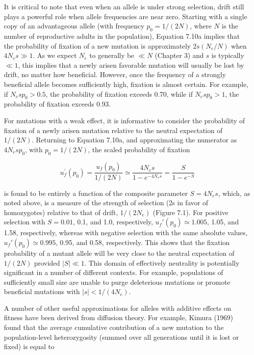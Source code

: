 \documentclass{article}
\begin{document}
It is critical to note that even when an allele is under strong selection, drift still plays a powerful role when allele frequencies are near zero. Starting with a single copy of an advantageous allele (with frequency  $ p_0 = 1/(2N) $, where  $ N $ is the number of reproductive adults in the population), Equation 7.10a implies that the probability of fixation of a new mutation is approximately  $ 2s(N_e/N) $ when  $ 4N_e s \gg 1 $. As we expect  $ N_e $ to generally be  $ \ll N $ (Chapter 3) and  $ s $ is typically  $ \ll 1 $, this implies that a newly arisen favorable mutation will usually be lost by drift, no matter how beneficial. However, once the frequency of a strongly beneficial allele becomes sufficiently high, fixation is almost certain. For example, if  $ N_{e}sp_0 > 0.5 $, the probability of fixation exceeds 0.70, while if  $ N_{e}sp_0 > 1 $, the probability of fixation exceeds 0.93.

For mutations with a weak effect, it is informative to consider the probability of fixation of a newly arisen mutation relative to the neutral expectation of  $ 1/(2N) $. Returning to Equation 7.10a, and approximating the numerator as  $ 4N_{e}sp_{0} $, with  $ p_{0}=1/(2N) $, the scaled probability of fixation

\begin{equation}
u_{f}^{\prime}(p_{0})=\frac{u_{f}(p_{0})}{1/(2N)}\simeq\frac{4N_{e}s}{1-e^{-4N_{e}s}}=\frac{S}{1-e^{-S}}
\tag{7.11}
\label{eq:7_11}
\end{equation}

is found to be entirely a function of the composite parameter  $ S = 4N_e s $, which, as noted above, is a measure of the strength of selection (2s in favor of homozygotes) relative to that of drift,  $ 1/(2N_e) $ (Figure 7.1). For positive selection with  $ S = 0.01 $, 0.1, and 1.0, respectively,  $ u_f'(p_0) \simeq 1.005 $, 1.05, and 1.58, respectively, whereas with negative selection with the same absolute values,  $ u_f'(p_0) \simeq 0.995 $, 0.95, and 0.58, respectively. This shows that the fixation probability of a mutant allele will be very close to the neutral expectation of  $ 1/(2N) $ provided  $ |S| \ll 1 $. This domain of effectively neutrality is potentially significant in a number of different contexts. For example, populations of sufficiently small size are unable to purge deleterious mutations or promote beneficial mutations with  $ |s| < 1/(4N_e) $.

A number of other useful approximations for alleles with additive effects on fitness have been derived from diffusion theory. For example, Kimura (1969) found that the average cumulative contribution of a new mutation to the population-level heterozygosity (summed over all generations until it is lost or fixed) is equal to
\end{document}
